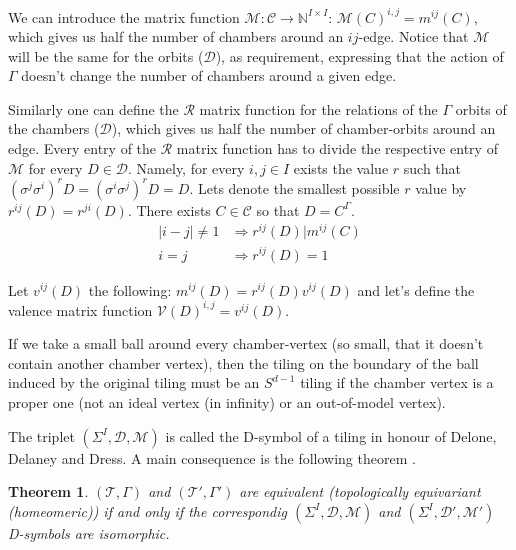 \documentclass[12pt,a4paper]{article}
\numberwithin{equation}{section}
\theoremstyle{plain}%
\newtheorem{thm}{Theorem}[section]
\theoremstyle{definition}
\theoremstyle{remark}
\begin{document}
We can introduce the matrix function $\mathcal{M}: \mathcal{C}
\rightarrow \mathbb{N}^{I\times I}$: $\mathcal{M}(C)^{i,j}=m^{ij}(C)$, which
gives us half the number of chambers around an $ij$-edge. Notice that $\mathcal{M}$
will be the same for the orbits ($\mathcal{D}$), as requirement, expressing that
the action of $\Gamma$ doesn't change the number of chambers around a given
edge.

Similarly one can define the $\mathcal{R}$ matrix function for the
relations of the $\Gamma$ orbits of the chambers ($\mathcal{D}$), which gives us
half the number of chamber-orbits around an edge. Every entry of the $\mathcal{R}$
matrix function has to divide the respective entry of $\mathcal{M}$ for
every $D\in\mathcal{D}$. Namely, for every $i,j\in I$ exists the value $r$ such that
$(\sigma^j\sigma^i)^rD=(\sigma^i\sigma^j)^rD=D$. Lets denote the smallest
possible $r$ value by $r^{ij}(D)=r^{ji}(D)$. There exists $C\in\mathcal{C}$ so
that $D=C^\Gamma$.
\begin{align}
  |i-j|\ne1 & \Rightarrow r^{ij}(D)|m^{ij}(C) \\
  \label{eqn:mxfun_constraint_end}i=j & \Rightarrow r^{ij}(D)=1
\end{align}

Let $v^{ij}(D)$ the following: $m^{ij}(D)=r^{ij}(D)v^{ij}(D)$ and
let's define the valence matrix function
$\mathcal{V}(D)^{i,j}=v^{ij}(D)$.


If we take a small ball around every chamber-vertex (so small, that it doesn't
contain another chamber vertex), then the tiling on the boundary of the ball
induced by the original tiling must be an $S^{d-1}$ tiling \cite{D87} if the
chamber vertex is a proper one (not an ideal vertex (in infinity) or an
out-of-model vertex).

The triplet $(\Sigma^I,\mathcal{D},\mathcal{M})$ is called the D-symbol of a
tiling in honour of Delone, Delaney and Dress. A main consequence is the
following theorem \cite{D87}.
\begin{thm}
$(\mathcal{T},\Gamma)$ and
$(\mathcal{T}',\Gamma')$ are equivalent (topologically equivariant (homeomeric))
if and only if the correspondig $(\Sigma^I,\mathcal{D},\mathcal{M})$ and
$(\Sigma^I,\mathcal{D}',\mathcal{M}')$ D-symbols are isomorphic.
\end{thm}
\end{document}
